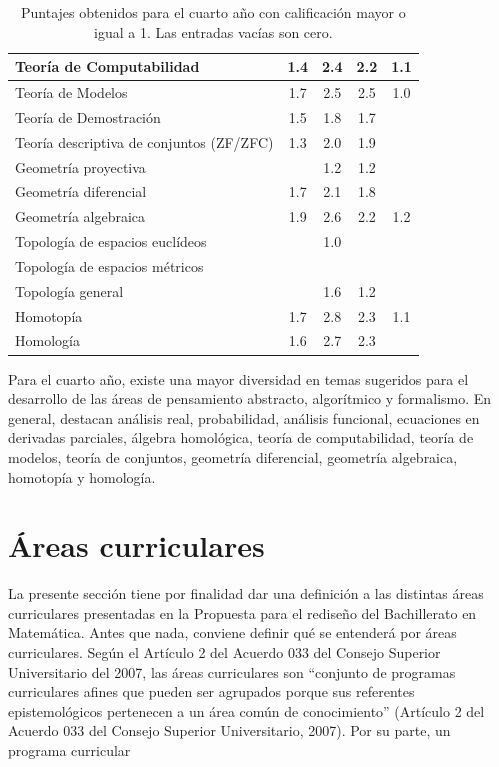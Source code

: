 \begin{refsection}
\begin{table}[H]
\begin{center}
\begin{tabular}{|l|c|c|c|c|}
Teoría de Computabilidad & 1.4 & 2.4 & 2.2 & 1.1 \\ \hline
Teoría de Modelos & 1.7 & 2.5 & 2.5 & 1.0 \\ \hline
Teoría de Demostración & 1.5 & 1.8 & 1.7 &  \\ \hline
Teoría descriptiva de conjuntos (ZF/ZFC) & 1.3 & 2.0 & 1.9 &  \\ \hline
Geometría proyectiva &  & 1.2 & 1.2 &  \\ \hline
Geometría diferencial & 1.7 & 2.1 & 1.8 &  \\ \hline
Geometría algebraica & 1.9 & 2.6 & 2.2 & 1.2 \\ \hline
Topología de espacios euclídeos &  & 1.0 &  &  \\ \hline
Topología de espacios métricos &  &  &  &  \\ \hline
Topología general &  & 1.6 & 1.2 &  \\ \hline
Homotopía & 1.7 & 2.8 & 2.3 & 1.1 \\ \hline
Homología & 1.6 & 2.7 & 2.3 &  \\ \hline
\end{tabular}
\end{center}
\caption{Puntajes obtenidos para el cuarto año con calificación mayor o igual a 1. Las entradas vacías son cero.} \label{Cuartoanno}
\end{table}

Para el cuarto año, existe una mayor diversidad en temas sugeridos para el desarrollo de las áreas de pensamiento abstracto, algorítmico y formalismo. En general, destacan análisis real, probabilidad, análisis funcional, ecuaciones en derivadas parciales, álgebra homológica, teoría de computabilidad, teoría de modelos, teoría de conjuntos, geometría diferencial, geometría algebraica, homotopía y homología.


\section{Áreas curriculares}

La presente sección tiene por finalidad dar una definición a las distintas áreas curriculares presentadas en la Propuesta para el rediseño del Bachillerato en Matemática. Antes que nada, conviene definir qué se entenderá por áreas curriculares. Según el Artículo 2 del Acuerdo 033 del Consejo Superior Universitario del 2007, las áreas curriculares son “conjunto de programas curriculares afines que pueden ser agrupados porque sus referentes epistemológicos pertenecen a un área común de conocimiento” (Artículo 2 del Acuerdo 033 del Consejo Superior Universitario, 2007). Por su parte, un programa curricular


\end{refsection}
